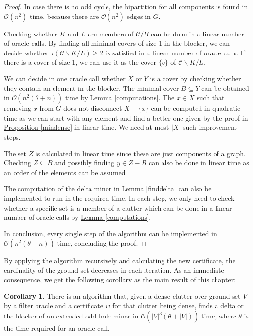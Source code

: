 \documentclass[a4paper, 12pt]{scrbook}
\theoremstyle{definition}
\newtheorem{corollary}[theorem]{Corollary}
\begin{document}
\begin{proof}
       In case there is no odd cycle, the bipartition for all components is found in $\mathcal{O}(n^2)$ time, because there are $\mathcal{O}(n^2)$ edges in $G$.

       Checking whether $K$ and $L$ are members of $\mathcal{C}/B$ can be done in a linear number of oracle calls.
       By finding all minimal covers of size 1 in the blocker, we can decide whether $\tau(\mathcal{C}\backslash K / L)\geq 2$ is satisfied in a linear number of oracle calls. If there is a cover of size 1, we can use it as the cover $\{b\}$ of $\mathcal{C}\backslash K / L$.

       We can decide in one oracle call whether $X$ or $Y$ is a cover by checking whether they contain an element in the blocker.
       The minimal cover $B \subseteq Y$ can be obtained in $\mathcal{O}(n^2(\theta+n))$ time by \hyperref[computations]{Lemma \ref*{computations}}.
       The $x \in X$ such that removing $x$ from $G$ does not disconnect $X - \{x\}$ can be computed in quadratic time as we can start with any element and find a better one given by the proof in \hyperref[mindense]{Proposition \ref*{mindense}} in linear time. We need at most $|X|$ such improvement steps.

       The set $Z$ is calculated in linear time since these are just components of a graph.
       Checking $Z \subseteq B$ and possibly finding $y \in Z-B$ can also be done in linear time as an order of the elements can be assumed.

       The computation of the delta minor in \hyperref[finddelta]{Lemma \ref*{finddelta}} can also be implemented to run in the required time. In each step, we only need to check whether a specific set is a member of a clutter which can be done in a linear number of oracle calls by \hyperref[computations]{Lemma \ref*{computations}}.

       In conclusion, every single step of the algorithm can be implemented in $\mathcal{O}(n^2(\theta+n))$ time, concluding the proof.
   \end{proof}

   By applying the algorithm recursively and calculating the new certificate, the cardinality of the ground set decreases in each iteration. As an immediate consequence, we get the following corollary as the main result of this chapter:

   \begin{corollary}
       There is an algorithm that, given a dense clutter over ground set $V$ by a filter oracle and a certificate $w$ for that clutter being dense, finds a delta or the blocker of an extended odd hole minor in $\mathcal{O}(|V|^3(\theta+|V|))$ time, where $\theta$ is the time required for an oracle call.
   \end{corollary}
\end{document}
